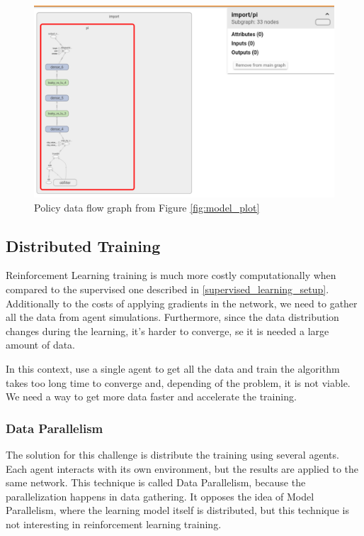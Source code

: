 \begin{figure}[!htbp]
	\centering
	\includegraphics[width=1.1\textwidth]{Cap5/policygraph2.eps}
	\caption{ Policy data flow graph from Figure \ref{fig:model_plot}
	}
	\label{fig:policygraph2}
\end{figure}


\subsection{Distributed Training}\label{sec:distributedtraining}
Reinforcement Learning training is much more costly computationally when compared to the supervised one described in \ref{supervised_learning_setup}. Additionally to the costs of applying gradients in the network, we need to gather all the data from agent simulations. Furthermore, since the data distribution changes during the learning, it's harder to converge, se it is needed a large amount of data.

In this context, use a single agent to get all the data and train the algorithm takes too long time to converge and, depending of the problem, it is not viable. We need a way to get more data faster and accelerate the training.

\subsubsection{Data Parallelism}

The solution for this challenge is distribute the training using several agents. Each agent interacts with its own environment, but the results are applied to the same network. This technique is called Data Parallelism, because the parallelization happens in data gathering. It opposes the idea of Model Parallelism, where the learning model itself is distributed, but this technique is not interesting in reinforcement learning training.

